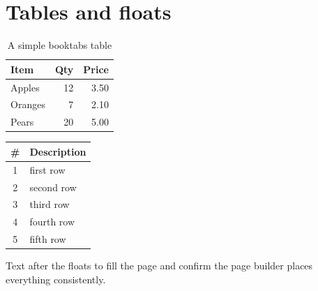 \documentclass[11pt]{article}
\begin{document}
\section{Tables and floats}

\begin{table}[h]
  \centering
  \caption{A simple booktabs table}
  \begin{tabular}{lrr}
    \toprule
    Item & Qty & Price \\
    \midrule
    Apples  & 12 & 3.50 \\
    Oranges &  7 & 2.10 \\
    Pears   & 20 & 5.00 \\
    \bottomrule
  \end{tabular}
\end{table}

\begin{longtable}{cl}
  \toprule
  \# & Description \\
  \midrule
  \endhead
  1 & first row \\
  2 & second row \\
  3 & third row \\
  4 & fourth row \\
  5 & fifth row \\
  \bottomrule
\end{longtable}

Text after the floats to fill the page and confirm the page builder
places everything consistently.
\end{document}
